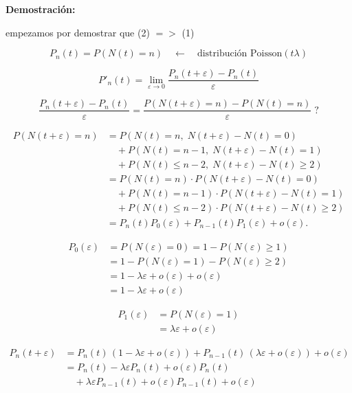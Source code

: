 \documentclass[12pt,a4paper]{article}
\begin{document}
\textbf{Demostración:}

empezamos por demostrar que (2) $= >$ (1)

\begin{equation*}
P_n(t) = P(N(t) = n) \quad \longleftarrow \quad \text{distribución Poisson}(t\lambda)
\end{equation*}

\begin{equation*}
P'_n(t) = \lim_{\varepsilon \to 0} \frac{P_n(t+\varepsilon) - P_n(t)}{\varepsilon}
\end{equation*}

\begin{equation*}
\frac{P_n(t+\varepsilon) - P_n(t)}{\varepsilon}
= \frac{P(N(t+\varepsilon)=n) - P(N(t)=n)}{\varepsilon}\; ?
\end{equation*}

\begin{align*}
P(N(t+\varepsilon) = n) 
&= P(N(t)=n,\; N(t+\varepsilon)-N(t)=0) \\
&\quad + P(N(t)=n-1,\; N(t+\varepsilon)-N(t)=1) \\
&\quad + P(N(t)\leq n-2,\; N(t+\varepsilon)-N(t)\geq 2) \\
&= P(N(t)=n)\cdot P(N(t+\varepsilon)-N(t)=0) \\
&\quad + P(N(t)=n-1)\cdot P(N(t+\varepsilon)-N(t)=1) \\
&\quad + P(N(t)\leq n-2)\cdot P(N(t+\varepsilon)-N(t)\geq 2) \\
&= P_n(t)P_0(\varepsilon) + P_{n-1}(t)P_1(\varepsilon) + o(\varepsilon).
\end{align*}


\begin{align*}
P_0(\varepsilon) &= P(N(\varepsilon)=0) 
= 1 - P(N(\varepsilon)\geq 1) \\
&= 1 - P(N(\varepsilon)=1) - P(N(\varepsilon)\geq 2) \\
&= 1 - \lambda \varepsilon + o(\varepsilon) + o(\varepsilon) \\
&= 1 - \lambda \varepsilon + o(\varepsilon)
\end{align*}

\begin{align*}
P_1(\varepsilon) &= P(N(\varepsilon)=1) \\
&= \lambda \varepsilon + o(\varepsilon)
\end{align*}

\begin{align*}
P_n(t+\varepsilon) 
&= P_n(t)\,(1 - \lambda \varepsilon + o(\varepsilon)) 
   + P_{n-1}(t)\,(\lambda \varepsilon + o(\varepsilon)) 
   + o(\varepsilon) \\
&= P_n(t) - \lambda \varepsilon P_n(t) + o(\varepsilon)P_n(t) \\
&\quad + \lambda \varepsilon P_{n-1}(t) + o(\varepsilon)P_{n-1}(t) 
   + o(\varepsilon)
\end{align*}
\end{document}
